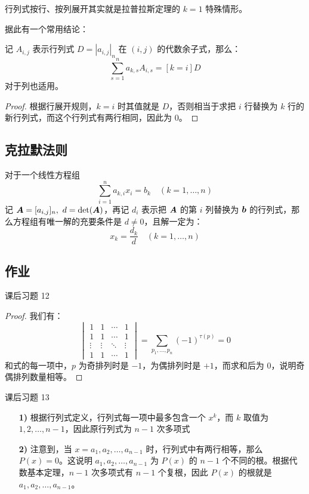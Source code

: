 行列式按行、按列展开其实就是拉普拉斯定理的 $k=1$ 特殊情形。

据此有一个常用结论：

\begin{theorem}
	记 $A_{i,j}$ 表示行列式 $D = |a_{i,j}|_n$ 在 $(i,j)$ 的代数余子式，那么：
	$$
	\sum_{s=1}^n a_{k,s} A_{i,s} = [k=i] D
	$$
	对于列也适用。

	\begin{proof}
		根据行展开规则，$k=i$ 时其值就是 $D$，否则相当于求把 $i$ 行替换为 $k$ 行的新行列式，而这个行列式有两行相同，因此为 $0$。
	\end{proof}
\end{theorem}

\subsection{克拉默法则}

\begin{theorem}[克拉默法则]
	对于一个线性方程组
	$$
	\sum_{i=1}^n a_{k,i} x_i = b_k \quad (k=1,\dots,n)
	$$
	记 $\boldsymbol{A} = [a_{i,j}]_n,\ d = \det(\boldsymbol{A})$，再记 $d_i$ 表示把 $\boldsymbol{A}$ 的第 $i$ 列替换为 $\boldsymbol{b}$ 的行列式，那么方程组有唯一解的充要条件是 $d \neq 0$，且解一定为：
	$$
	x_k = \frac{d_k}{d} \quad (k=1,\dots,n)
	$$
\end{theorem}

\subsection{作业}

\begin{problem}
	课后习题 12
	\begin{proof}
		我们有：
		$$
		\begin{vmatrix}
			1 & 1 & \cdots & 1 \\
			1 & 1 & \cdots & 1 \\
			\vdots & \vdots & \ddots & \vdots \\
			1 & 1 & \cdots & 1
		\end{vmatrix} = \sum_{p_1,\dots,p_n} (-1)^{\tau(p)} = 0
		$$
		和式的每一项中，$p$ 为奇排列时是 $-1$，为偶排列时是 $+1$，而求和后为 $0$，说明奇偶排列数量相等。
	\end{proof}
\end{problem}

\begin{problem}
	课后习题 13
	\begin{solution}
		\begin{enumerate}
			\item[\textbf{1)}] 根据行列式定义，行列式每一项中最多包含一个 $x^k$，而 $k$ 取值为 $1,2,\dots,n-1$，因此原行列式为 $n-1$ 次多项式
			\item[\textbf{2)}] 注意到，当 $x=a_1,a_2,\dots,a_{n-1}$ 时，行列式中有两行相等，那么 $P(x) = 0$。这说明 $a_1,a_2,\dots,a_{n-1}$ 为 $P(x)$ 的 $n-1$ 个不同的根。根据代数基本定理，$n-1$ 次多项式有 $n-1$ 个复根，因此 $P(x)$ 的根就是 $a_1,a_2,\dots,a_{n-1}$。
		\end{enumerate}
	\end{solution}
\end{problem}

